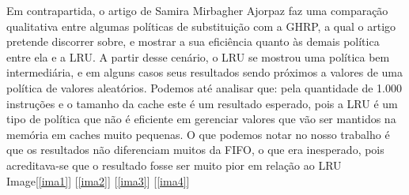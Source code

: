     Em contrapartida, o artigo de Samira Mirbagher Ajorpaz \cite{b3} faz uma comparação qualitativa entre algumas políticas de substituição
    com a GHRP, a qual o artigo pretende discorrer sobre, e mostrar a sua eficiência quanto às demais política entre ela e a LRU. A partir
    desse cenário, o LRU se mostrou uma política bem intermediária, e em alguns casos seus resultados sendo próximos a valores de uma 
    política de valores aleatórios. Podemos até analisar que: pela quantidade de 1.000 instruções e o tamanho da cache este é um resultado 
    esperado, pois a LRU é um tipo de política que não é eficiente em gerenciar valores que vão ser mantidos na memória em caches muito 
    pequenas. O que podemos notar no nosso trabalho é que os resultados não diferenciam muitos da FIFO, o que era inesperado, pois acreditava-se 
    que o resultado fosse ser muito pior em relação ao LRU Image[\ref{ima1}] [\ref{ima2}] [\ref{ima3}] [\ref{ima4}]